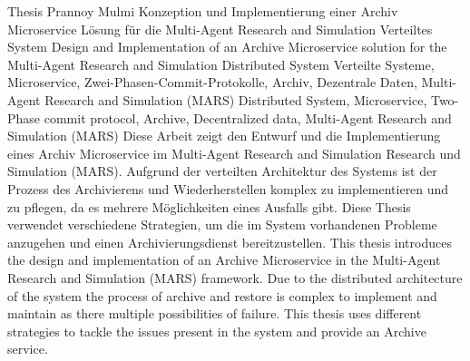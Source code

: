													{ Thesis }																			%
													{Prannoy Mulmi}														%
													{Konzeption und Implementierung einer Archiv Microservice L\"osung f\"ur die Multi-Agent Research and
													Simulation Verteiltes System}											  %
													{Design and Implementation of an Archive Microservice solution for the Multi-Agent Research and
													Simulation Distributed System}							%
													{Verteilte Systeme, Microservice, Zwei-Phasen-Commit-Protokolle, Archiv, Dezentrale Daten, Multi-Agent Research and Simulation (MARS)}																		%
													{Distributed System, Microservice, Two-Phase commit protocol, Archive, Decentralized data, Multi-Agent Research and Simulation (MARS)}																			%
													{Diese Arbeit zeigt den Entwurf und die Implementierung eines Archiv Microservice im Multi-Agent Research and Simulation
													Research und Simulation (MARS). Aufgrund der verteilten Architektur des Systems ist der Prozess des Archivierens
													und Wiederherstellen komplex zu implementieren und zu pflegen, da es mehrere M\"oglichkeiten eines Ausfalls gibt. Diese Thesis
													verwendet verschiedene Strategien, um die im System vorhandenen Probleme anzugehen und einen Archivierungsdienst bereitzustellen.}	
													{This thesis introduces the design and implementation of an Archive Microservice in the Multi-Agent
													Research and Simulation (MARS) framework. Due to the distributed architecture of the system the process of
													archive and restore is complex to implement and maintain as there multiple possibilities of failure. This thesis
													uses different strategies to tackle the issues present in the system and provide an Archive service.}	

												
  									  													


	  																							


